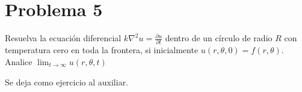 \section{Problema 5}
 Resuelva la ecuación diferencial $k \nabla^{2} u=\frac{\partial u}{\partial t}$ dentro de un círculo de radio $R$ con
temperatura cero en toda la frontera, si inicialmente $u(r, \theta, 0)=f(r, \theta) .$ Analice
$\lim _{t \rightarrow \infty} u(r, \theta, t)$

\begin{solution}
Se deja como ejercicio al auxiliar.
\end{solution}